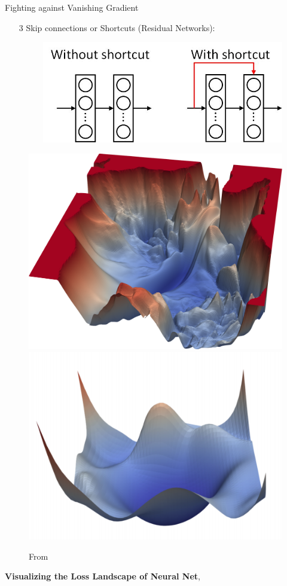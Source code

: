 \documentclass[xcolor=pdftex,dvipsnames,table,mathserif]{beamer}
\begin{document}
\begin{frame}{Fighting against Vanishing Gradient}
\begin{enumerate}
\item[3] Skip connections or Shortcuts (Residual Networks): 
\begin{figure}
\includegraphics[width=.65 \columnwidth]{../graphics/shortcut}
\end{figure}
\end{enumerate}
\begin{figure}
\includegraphics[width=.4\columnwidth]{../graphics/VGG56Loss}
\includegraphics[width=.45\columnwidth]{../graphics/Resnet56}
\caption{From \cite{li2017visualizing}}
\end{figure}


\textbf{Visualizing the Loss Landscape of Neural Net}, \cite{li2017visualizing}

\end{frame}
\end{document}
